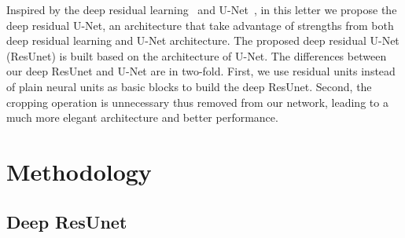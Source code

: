 \documentclass[journal]{IEEEtran}
\begin{document}
Inspired by the deep residual learning~\cite{resnet2015deep} and U-Net~\cite{U-NET2015}, in this letter we propose the deep residual U-Net, an architecture that take advantage of strengths from both deep residual learning and U-Net architecture. The proposed deep residual U-Net (ResUnet) is built based on the architecture of U-Net. The differences between our deep ResUnet and U-Net are in two-fold. First, we use residual units instead of plain neural units as basic blocks to build the deep ResUnet. Second, the cropping operation is unnecessary thus removed from our network, leading to a much more elegant architecture and better performance. 


\vspace{-0.3cm}
\section{Methodology}
\label{sec:methodology}

\subsection{Deep ResUnet}
\end{document}
